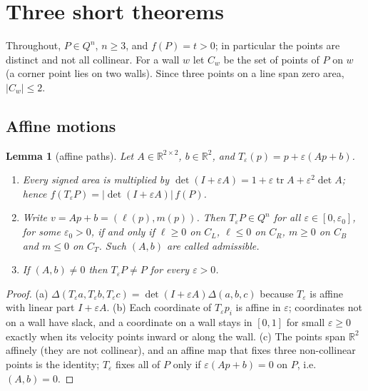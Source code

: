 \documentclass[11pt]{amsart}
\newtheorem{lemma}[theorem]{Lemma}
\theoremstyle{definition}
\newcommand{\R}{\mathbb{R}}
\newcommand{\tr}{\operatorname{tr}}
\begin{document}
\section{Three short theorems}\label{sec:theory}

Throughout, $P \in Q^n$, $n \ge 3$, and $f(P) = t > 0$; in particular the points are distinct and not all collinear. For a wall $w$ let $C_w$ be the set of points of $P$ on $w$ (a corner point lies on two walls). Since three points on a line span zero area, $|C_w| \le 2$.

\subsection{Affine motions}

\begin{lemma}[affine paths]\label{lem:affine}
Let $A \in \R^{2\times2}$, $b \in \R^2$, and $T_\varepsilon(p) = p + \varepsilon(Ap+b)$.
\begin{enumerate}[label=(\alph*)]
\item Every signed area is multiplied by $\det(I+\varepsilon A) = 1 + \varepsilon \tr A + \varepsilon^2 \det A$; hence $f(T_\varepsilon P) = \lvert\det(I+\varepsilon A)\rvert\, f(P)$.
\item Write $v = Ap + b = (\ell(p), m(p))$. Then $T_\varepsilon P \in Q^n$ for all $\varepsilon \in [0,\varepsilon_0]$, for some $\varepsilon_0 > 0$, if and only if $\ell \ge 0$ on $C_L$, $\ell \le 0$ on $C_R$, $m \ge 0$ on $C_B$ and $m \le 0$ on $C_T$. Such $(A,b)$ are called \emph{admissible}.
\item If $(A,b) \ne 0$ then $T_\varepsilon P \ne P$ for every $\varepsilon > 0$.
\end{enumerate}
\end{lemma}

\begin{proof}
(a) $\Delta(T_\varepsilon a, T_\varepsilon b, T_\varepsilon c) = \det(I+\varepsilon A)\Delta(a,b,c)$ because $T_\varepsilon$ is affine with linear part $I+\varepsilon A$.
(b) Each coordinate of $T_\varepsilon p_i$ is affine in $\varepsilon$; coordinates not on a wall have slack, and a coordinate on a wall stays in $[0,1]$ for small $\varepsilon \ge 0$ exactly when its velocity points inward or along the wall.
(c) The points span $\R^2$ affinely (they are not collinear), and an affine map that fixes three non-collinear points is the identity; $T_\varepsilon$ fixes all of $P$ only if $\varepsilon(Ap+b) = 0$ on $P$, i.e.\ $(A,b) = 0$.
\end{proof}
\end{document}
